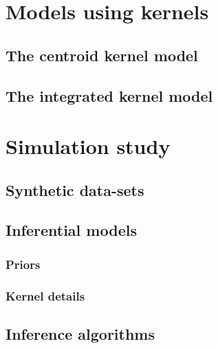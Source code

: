 \documentclass[a4paper, nobind]{templates/ociamthesis}
\begin{document}
\hypertarget{models-using-kernels}{%
\section{Models using kernels}\label{models-using-kernels}}

\hypertarget{the-centroid-kernel-model}{%
\subsection{The centroid kernel model}\label{the-centroid-kernel-model}}

\hypertarget{the-integrated-kernel-model}{%
\subsection{The integrated kernel model}\label{the-integrated-kernel-model}}

\hypertarget{simulation-study}{%
\section{Simulation study}\label{simulation-study}}

\hypertarget{synthetic-data-sets}{%
\subsection{Synthetic data-sets}\label{synthetic-data-sets}}

\hypertarget{inferential-models}{%
\subsection{Inferential models}\label{inferential-models}}

\hypertarget{priors}{%
\subsubsection{Priors}\label{priors}}

\hypertarget{kernel-details}{%
\subsubsection{Kernel details}\label{kernel-details}}

\hypertarget{inference-algorithms}{%
\subsection{Inference algorithms}\label{inference-algorithms}}
\end{document}
